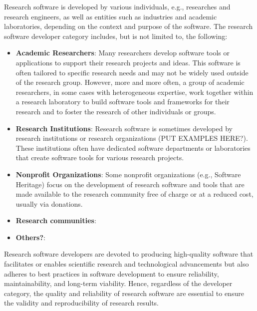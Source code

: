 Research software is developed by various individuals, e.g., researches and research engineers, as well as entities such as industries and academic laboratories, depending on the context and purpose of the software. 
The research software developer category includes, but is not limited to, the following: 
\begin{itemize}
\item \textbf{Academic Researchers}: Many researchers develop software tools or applications to support their research projects and ideas. This software is often tailored to specific research needs and may not be widely used outside of the research group. However, more and more often, a group of academic researchers, in some cases with heterogeneous expertise, work together within a research laboratory to build software tools and frameworks for their research and to foster the research of other individuals or groups.
\item \textbf{Research Institutions}: Research software is sometimes developed by research institutions or research organizations (PUT EXAMPLES HERE?). These institutions often have dedicated software departments or laboratories that create software tools for various research projects.
\item \textbf{Nonprofit Organizations}: Some nonprofit organizations (e.g., Software Heritage) focus on the development of research software and tools that are made available to the research community free of charge or at a reduced cost, usually via donations.
\item \textbf{Research communities}: 
\item \textbf{Others?}:
\end{itemize}


Research software developers are devoted to producing high-quality software that facilitates or enables scientific research and technological advancements but also adheres to best practices in software development to ensure reliability, maintainability, and long-term viability. Hence, regardless of the developer category, the quality and reliability of research software are essential to ensure the validity and reproducibility of research results.


